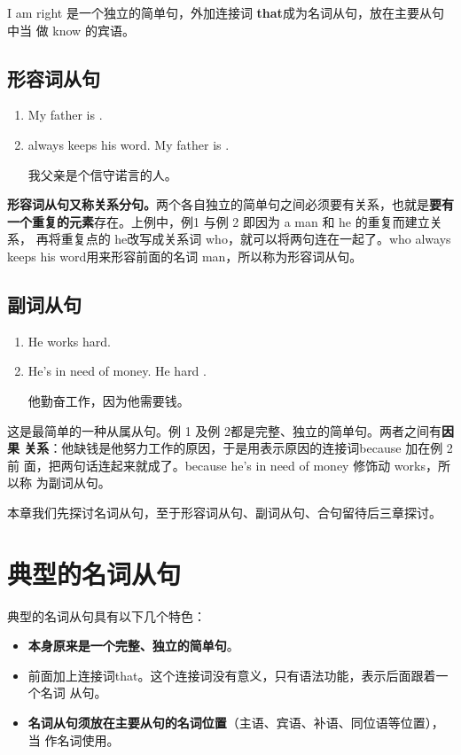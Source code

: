 I am right 是一个独立的简单句，外加连接词 \textbf{that}成为名词从句，放在主要从句中当
做 know 的宾语。

\subsection{形容词从句}

\begin{enumerate}
\item My father is .
\item {} always keeps his word.
\reitem My father is  .

我父亲是个信守诺言的人。
\end{enumerate}

\textbf{形容词从句又称关系分句。}两个各自独立的简单句之间必须要有关系，也就是\textbf{要有
  一个重复的元素}存在。上例中，例1 与例 2 即因为 a man 和 he 的重复而建立关系，
再将重复点的 he改写成关系词 who，就可以将两句连在一起了。who always keeps
his word用来形容前面的名词 man，所以称为形容词从句。

\subsection{副词从句}

\begin{enumerate}
\item   He works hard.
\item He's in need of money. \reitem He  hard .

他勤奋工作，因为他需要钱。
\end{enumerate}
这是最简单的一种从属从句。例 1 及例 2都是完整、独立的简单句。两者之间有\textbf{因果
  关系}：他缺钱是他努力工作的原因，于是用表示原因的连接词because 加在例 2 前
面，把两句话连起来就成了。because he's in need of money 修饰动 works，所以称
为副词从句。

本章我们先探讨名词从句，至于形容词从句、副词从句、合句留待后三章探讨。

\section{典型的名词从句}

典型的名词从句具有以下几个特色：
\begin{itemize}
\item \textbf{本身原来是一个完整、独立的简单句}。

\item 前面加上连接词that。这个连接词没有意义，只有语法功能，表示后面跟着一个名词
  从句。

\item \textbf{名词从句须放在主要从句的名词位置}（主语、宾语、补语、同位语等位置），当
  作名词使用。
\end{itemize}

